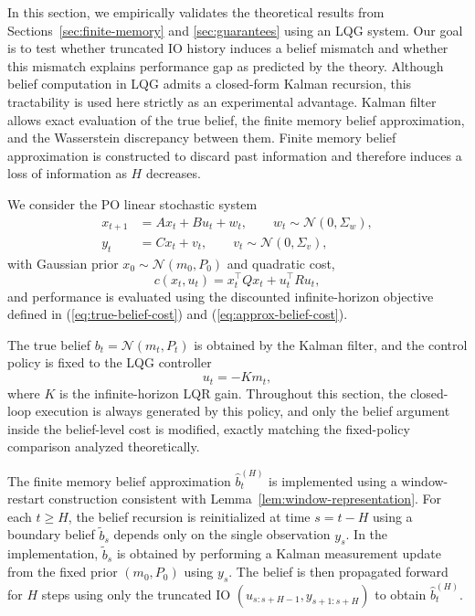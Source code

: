 \documentclass[letterpaper, 10 pt, conference]{ieeeconf}
\begin{document}
In this section, we empirically validates the theoretical results from Sections~\ref{sec:finite-memory} and \ref{sec:guarantees} using an LQG system.
Our goal is to test whether truncated IO history induces a belief mismatch and whether this mismatch explains performance gap as predicted by the theory.
Although belief computation in LQG admits a closed-form Kalman recursion, this tractability is used here strictly as an experimental advantage.
Kalman filter allows exact evaluation of the true belief, the finite memory belief approximation, and the Wasserstein discrepancy between them.
Finite memory belief approximation is constructed to discard past information and therefore induces a loss of information as $H$ decreases.

We consider the PO linear stochastic system
\begin{align}
x_{t+1} &= A x_t + B u_t + w_t,
\qquad w_t \sim \mathcal{N}(0,\Sigma_w), \\
y_t &= C x_t + v_t,
\qquad v_t \sim \mathcal{N}(0,\Sigma_v),
\end{align}
with Gaussian prior $x_0 \sim \mathcal{N}(m_0,P_0)$ and quadratic cost,
\begin{equation}
c(x_t,u_t) = x_t^\top Q x_t + u_t^\top R u_t,
\end{equation}
and performance is evaluated using the discounted infinite-horizon objective defined in (\ref{eq:true-belief-cost}) and (\ref{eq:approx-belief-cost}).

The true belief $b_t=\mathcal{N}(m_t,P_t)$ is obtained by the Kalman filter, and the control policy is fixed to the LQG controller
\begin{equation}
u_t = -K m_t,
\end{equation}
where $K$ is the infinite-horizon LQR gain.
Throughout this section, the closed-loop execution is always generated by this policy, and only the belief argument inside the belief-level cost is modified, exactly matching the fixed-policy comparison analyzed theoretically.

The finite memory belief approximation $\hat b_t^{(H)}$ is implemented using
a window-restart construction consistent with Lemma~\ref{lem:window-representation}.
For each $t \ge H$, the belief recursion is reinitialized at time $s=t-H$
using a boundary belief $\tilde b_s$ depends only on the single observation $y_s$.
In the implementation, $\tilde b_s$ is obtained by performing a Kalman measurement update from the fixed prior $(m_0,P_0)$ using $y_s$.
The belief is then propagated forward for $H$ steps using only the truncated IO $(u_{s:s+H-1},y_{s+1:s+H})$ to obtain $\hat b_t^{(H)}$.
\end{document}
